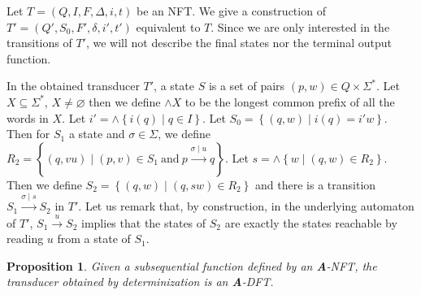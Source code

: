 \documentclass[12pt]{report}
\newtheorem{prp}{Proposition}[section]
\theoremstyle{definition}
\theoremstyle{remark}
\begin{document}
Let $T=(Q,I,F,\Delta,i,t)$ be an NFT. We give a construction of $T'=(Q',S_0,F',\delta,i',t')$ equivalent to $T$.
Since we are only interested in the transitions of $T'$, we will not describe the final states nor the terminal output function.

In the obtained transducer $T'$, a state $S$ is a set of pairs $(p,w)\in Q\times \Sigma^\ast$.
Let $X\subseteq \Sigma^\ast$, $X\neq \varnothing$ then we define $\wedge X$ to be the longest common prefix of all the words in $X$.
Let $i'=\wedge\left\{i(q)\mid q\in I \right\}$.
Let $S_0=\left\{(q,w)\mid i(q)=i'w\right\}$.
Then for $S_1$ a state and $\sigma \in \Sigma$, we define $R_2=\left\{ (q,vu)\mid  (p,v)\in S_1\ \mathrm{and}\ p\xrightarrow{\sigma\mid u}q\right\}$.
Let $s=\wedge\left\{w\mid (q,w)\in R_2\right\}$.
Then we define $S_2=\left\{ (q,w)\mid  (q,sw)\in R_2 \right\}$ and there is a transition $S_1\xrightarrow{\sigma\mid s}S_2$ in $T'$.
Let us remark that, by construction, in the underlying automaton of $T'$, $S_1\xrightarrow{u}S_2$ implies that the states of $S_2$ are exactly the states reachable by reading $u$ from a state of $S_1$.

\begin{prp}
Given a subsequential function defined by an \textbf A-NFT, the transducer obtained by determinization is an \textbf A-DFT.
\end{prp}
\end{document}
